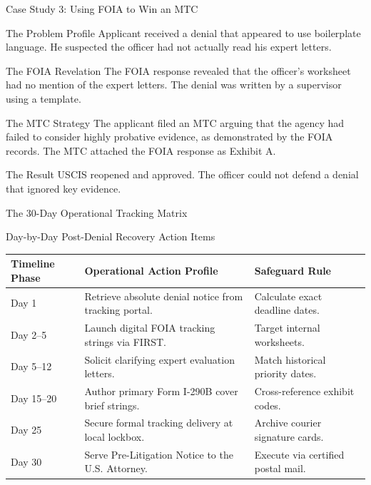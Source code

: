 \documentclass[11pt]{beamer}
\begin{document}
	\begin{frame}{Case Study 3: Using FOIA to Win an MTC}
		\scriptsize
		\begin{block}{The Problem Profile}
			Applicant received a denial that appeared to use boilerplate language. He suspected the officer had not actually read his expert letters.
		\end{block}
		\begin{block}{The FOIA Revelation}
			The FOIA response revealed that the officer's worksheet had no mention of the expert letters. The denial was written by a supervisor using a template.
		\end{block}
		\begin{block}{The MTC Strategy}
			The applicant filed an MTC arguing that the agency had failed to consider highly probative evidence, as demonstrated by the FOIA records. The MTC attached the FOIA response as Exhibit A.
		\end{block}
		\begin{block}{The Result}
			USCIS reopened and approved. The officer could not defend a denial that ignored key evidence.
		\end{block}
	\end{frame}
	
	
	\begin{frame}{The 30-Day Operational Tracking Matrix}
		\scriptsize
		\begin{block}{Day-by-Day Post-Denial Recovery Action Items}
			\centering
			\begin{tabular}{|p{2cm}|p{6cm}|p{3cm}|}
				\hline
				\textbf{Timeline Phase} & \textbf{Operational Action Profile} & \textbf{Safeguard Rule} \\
				\hline
				Day 1 & Retrieve absolute denial notice from tracking portal. & Calculate exact deadline dates. \\
				\hline
				Day 2--5 & Launch digital FOIA tracking strings via FIRST. & Target internal worksheets. \\
				\hline
				Day 5--12 & Solicit clarifying expert evaluation letters. & Match historical priority dates. \\
				\hline
				Day 15--20 & Author primary Form I-290B cover brief strings. & Cross-reference exhibit codes. \\
				\hline
				Day 25 & Secure formal tracking delivery at local lockbox. & Archive courier signature cards. \\
				\hline
				Day 30 & Serve Pre-Litigation Notice to the U.S. Attorney. & Execute via certified postal mail. \\
				\hline
			\end{tabular}
		\end{block}
	\end{frame}
	
\end{document}
